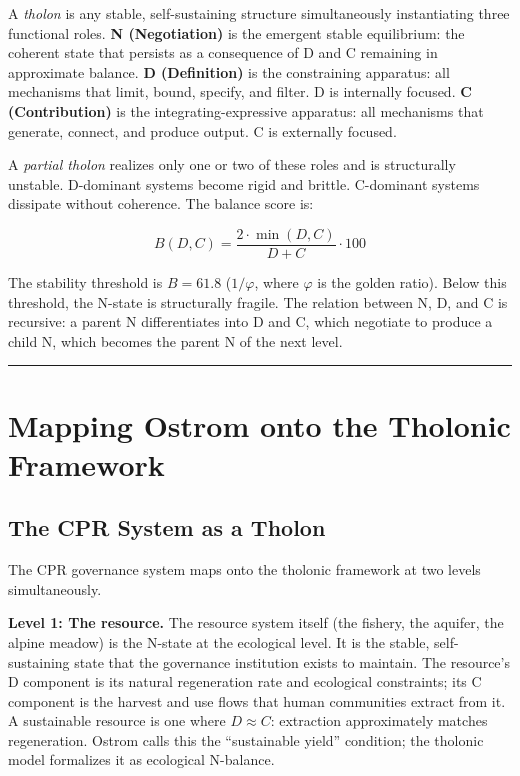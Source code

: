 \documentclass[12pt]{article}
\begin{document}
A \emph{tholon} is any stable, self-sustaining structure simultaneously
instantiating three functional roles. \textbf{N (Negotiation)} is the
emergent stable equilibrium: the coherent state that persists as a
consequence of D and C remaining in approximate balance. \textbf{D
(Definition)} is the constraining apparatus: all mechanisms that limit,
bound, specify, and filter. D is internally focused. \textbf{C
(Contribution)} is the integrating-expressive apparatus: all mechanisms
that generate, connect, and produce output. C is externally focused.

A \emph{partial tholon} realizes only one or two of these roles and is
structurally unstable. D-dominant systems become rigid and brittle.
C-dominant systems dissipate without coherence. The balance score is:

\[B(D,C) = \frac{2 \cdot \min(D,C)}{D + C} \cdot 100\]

The stability threshold is \(B = 61.8\) (\(1/\varphi\), where
\(\varphi\) is the golden ratio). Below this threshold, the N-state is
structurally fragile. The relation between N, D, and C is recursive: a
parent N differentiates into D and C, which negotiate to produce a child
N, which becomes the parent N of the next level.

\begin{center}\rule{0.5\linewidth}{0.5pt}\end{center}

\section{Mapping Ostrom onto the Tholonic Framework}\label{mapping-ostrom-onto-the-tholonic-framework}

\subsection{The CPR System as a Tholon}\label{the-cpr-system-as-a-tholon}

The CPR governance system maps onto the tholonic framework at two levels
simultaneously.

\textbf{Level 1: The resource.} The resource system itself (the fishery,
the aquifer, the alpine meadow) is the N-state at the ecological level.
It is the stable, self-sustaining state that the governance institution
exists to maintain. The resource's D component is its natural
regeneration rate and ecological constraints; its C component is the
harvest and use flows that human communities extract from it. A
sustainable resource is one where \(D \approx C\): extraction
approximately matches regeneration. Ostrom calls this the ``sustainable
yield'' condition; the tholonic model formalizes it as ecological
N-balance.
\end{document}
